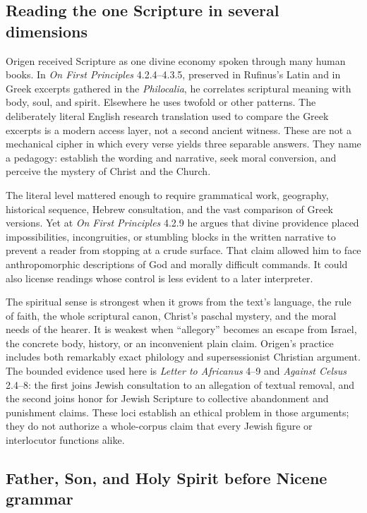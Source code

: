 \subsection{Reading the one Scripture in several dimensions}

Origen received Scripture as one divine economy spoken through many human
books. In \emph{On First Principles} 4.2.4--4.3.5, preserved in Rufinus's
Latin and in Greek excerpts gathered in the \emph{Philocalia}, he correlates
scriptural meaning with body, soul, and spirit. Elsewhere he uses twofold or
other patterns. The deliberately literal English research translation used to
compare the Greek excerpts is a modern access layer, not a second ancient
witness. These are not a mechanical cipher in which every verse yields three
separable answers. They name a pedagogy: establish the wording and narrative,
seek moral conversion, and perceive the mystery of Christ and the Church.

The literal level mattered enough to require grammatical work, geography,
historical sequence, Hebrew consultation, and the vast comparison of Greek
versions. Yet at \emph{On First Principles} 4.2.9 he argues that divine
providence placed
impossibilities, incongruities, or stumbling blocks in the written narrative
to prevent a reader from stopping at a crude surface. That claim allowed him
to face anthropomorphic descriptions of God and morally difficult commands.
It could also license readings whose control is less evident to a later
interpreter.

The spiritual sense is strongest when it grows from the text's language, the
rule of faith, the whole scriptural canon, Christ's paschal mystery, and the
moral needs of the hearer. It is weakest when ``allegory'' becomes an escape
from Israel, the concrete body, history, or an inconvenient plain claim.
Origen's practice includes both remarkably exact philology and supersessionist
Christian argument. The bounded evidence used here is \emph{Letter to
Africanus} 4--9 and \emph{Against Celsus} 2.4--8: the first joins Jewish
consultation to an allegation of textual removal, and the second joins honor
for Jewish Scripture to collective abandonment and punishment claims. These
loci establish an ethical problem in those arguments; they do not authorize a
whole-corpus claim that every Jewish figure or interlocutor functions alike.

\subsection{Father, Son, and Holy Spirit before Nicene grammar}

